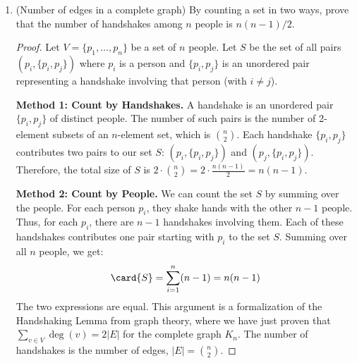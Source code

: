 \begin{enumerate}
    \item {} (Number of edges in a complete graph) By counting a set in two ways, prove that the number of handshakes among $n$ people is $n(n-1)/2$.
    \begin{proof}
    Let $V = \{p_1, \dots, p_n\}$ be a set of $n$ people. Let $S$ be the set of all pairs $(p_i, \{p_i, p_j\})$ where $p_i$ is a person and $\{p_i, p_j\}$ is an unordered pair representing a handshake involving that person (with $i \neq j$).
    
    \textbf{Method 1: Count by Handshakes.}
    A handshake is an unordered pair $\{p_i, p_j\}$ of distinct people. The number of such pairs is the number of 2-element subsets of an $n$-element set, which is $\binom{n}{2}$. Each handshake $\{p_i, p_j\}$ contributes two pairs to our set $S$: $(p_i, \{p_i, p_j\})$ and $(p_j, \{p_i, p_j\})$.
    Therefore, the total size of $S$ is $2 \cdot \binom{n}{2} = 2 \cdot \frac{n(n-1)}{2} = n(n-1)$.
    
    \textbf{Method 2: Count by People.}
    We can count the set $S$ by summing over the people. For each person $p_i$, they shake hands with the other $n-1$ people. Thus, for each $p_i$, there are $n-1$ handshakes involving them. Each of these handshakes contributes one pair starting with $p_i$ to the set $S$.
    Summing over all $n$ people, we get:
    $$ \card{S} = \sum_{i=1}^{n} (n-1) = n(n-1) $$
    The two expressions are equal. This argument is a formalization of the Handshaking Lemma from graph theory, where we have just proven that $\sum_{v \in V} \deg(v) = 2|E|$ for the complete graph $K_n$. The number of handshakes is the number of edges, $|E| = \binom{n}{2}$.
    \end{proof}
\end{enumerate}

